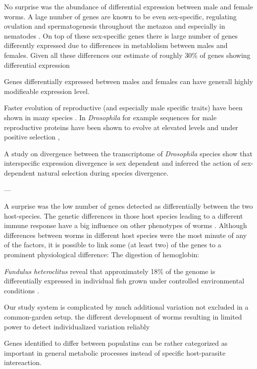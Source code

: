 No surprise was the abundance of differential expression between male
and female worms. A lage number of genes are known to be even
sex-specific, regulating ovulation and spermatogenesis throughout the
metazoa \cite{pmid16825664} and especially in nematodes
\cite{pmid15987632}. On top of these sex-specific genes there is large
number of genes differently expressed due to differences in
metablolism between males and females.  Given all these differences
our estimate of roughly 30\% of genes showing differential expression

Genes differentially expressed between males and females can have
generall highly modifieable expression level. 


Faster evolution of reproductive (and especially male specific traits)
have been shown in many species \cite{pmid15795858}. In
\textit{Drosophila} for example sequences for male reproductive
proteins have been shown to evolve at elevated levels and under
positive selection \cite{pmid11404480},

A study on divergence between the transcriptome of \textit{Drosophila}
species show that interspecific expression divergence is sex dependent
\cite{pmid19720861} and inferred the action of sex-dependent natural
selection during species divergence.


---

A surprise was the low number of genes detected as differentially
between the two host-species. The genetic differences in those host
species leading to a different immune response have a big influence on
other phenotypes of worms \cite{knopf_swimbladder_2006}. Although
differences between worms in different host species were the most
minute of any of the factors, it is possible to link some (at least
two) of the genes to a prominent physiological difference: The
digestion of hemoglobin:


\textit{Fundulus heteroclitus} reveal that approximately 18\% of the
genome is differentially expressed in individual fish grown under
controlled environmental conditions \cite{pmid20581107, pmid12219088,
  pmid16567645}.

Our study system is complicated by much additional variation not
excluded in a common-garden setup. the different development of worms
resulting in limited power to detect individualized variation reliably



Genes identified to differ between populatins can be rather
categorized as important in general metabolic processes instead of
specific host-parasite intereaction.

